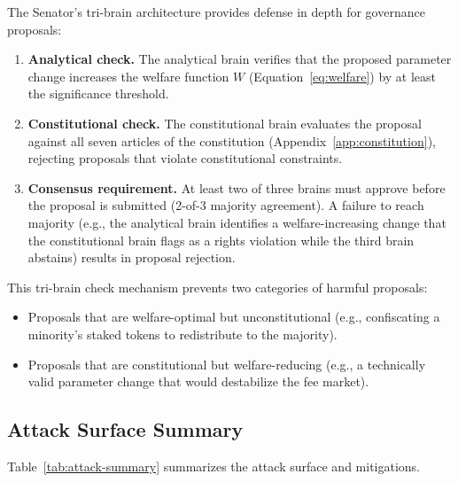 The Senator's tri-brain architecture provides defense in depth for governance
proposals:

\begin{enumerate}
  \item \textbf{Analytical check.} The analytical brain verifies that the
    proposed parameter change increases the welfare function $W$
    (Equation~\eqref{eq:welfare}) by at least the significance threshold.
  \item \textbf{Constitutional check.} The constitutional brain evaluates the
    proposal against all seven articles of the constitution
    (Appendix~\ref{app:constitution}), rejecting proposals that violate
    constitutional constraints.
  \item \textbf{Consensus requirement.} At least two of three brains must approve before the
    proposal is submitted (2-of-3 majority agreement). A failure to reach majority
    (e.g., the analytical brain identifies a welfare-increasing change that the constitutional brain flags
    as a rights violation while the third brain abstains) results in proposal rejection.
\end{enumerate}

This tri-brain check mechanism prevents two categories of harmful proposals:
\begin{itemize}
  \item Proposals that are welfare-optimal but unconstitutional (e.g.,
    confiscating a minority's staked tokens to redistribute to the majority).
  \item Proposals that are constitutional but welfare-reducing (e.g., a
    technically valid parameter change that would destabilize the fee market).
\end{itemize}

\subsection{Attack Surface Summary}
\label{subsec:attack-summary}

Table~\ref{tab:attack-summary} summarizes the attack surface and mitigations.

